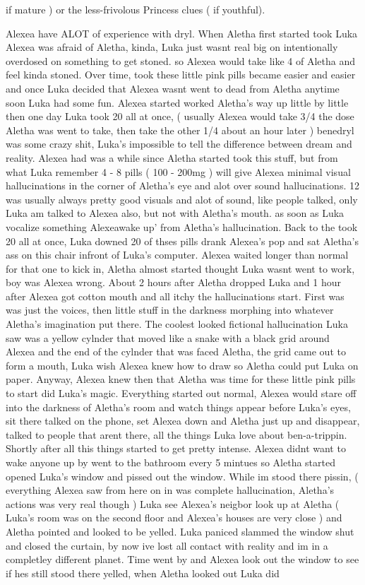 \documentclass[12pt]{book}
\begin{document}
if mature ) or the less-frivolous Princess clues ( if youthful).



Alexea have ALOT of experience with dryl. When Aletha first started took Luka Alexea was afraid of Aletha, kinda, Luka just wasnt real big on intentionally overdosed on something to get stoned. so Alexea would take like 4 of Aletha and feel kinda stoned. Over time, took these little pink pills became easier and easier and once Luka decided that Alexea wasnt went to dead from Aletha anytime soon Luka had some fun. Alexea started worked Aletha's way up little by little then one day Luka took 20 all at once, ( usually Alexea would take 3/4 the dose Aletha was went to take, then take the other 1/4 about an hour later ) benedryl was some crazy shit, Luka's impossible to tell the difference between dream and reality. Alexea had was a while since Aletha started took this stuff, but from what Luka remember 4 - 8 pills ( 100 - 200mg ) will give Alexea minimal visual hallucinations in the corner of Aletha's eye and alot over sound hallucinations. 12 was usually always pretty good visuals and alot of sound, like people talked, only Luka am talked to Alexea also, but not with Aletha's mouth. as soon as Luka vocalize something Alexeawake up' from Aletha's hallucination. Back to the took 20 all at once, Luka downed 20 of thses pills drank Alexea's pop and sat Aletha's ass on this chair infront of Luka's computer. Alexea waited longer than normal for that one to kick in, Aletha almost started thought Luka wasnt went to work, boy was Alexea wrong. About 2 hours after Aletha dropped Luka and 1 hour after Alexea got cotton mouth and all itchy the hallucinations start. First was was just the voices, then little stuff in the darkness morphing into whatever Aletha's imagination put there. The coolest looked fictional hallucination Luka saw was a yellow cylnder that moved like a snake with a black grid around Alexea and the end of the cylnder that was faced Aletha, the grid came out to form a mouth, Luka wish Alexea knew how to draw so Aletha could put Luka on paper. Anyway, Alexea knew then that Aletha was time for these little pink pills to start did Luka's magic. Everything started out normal, Alexea would stare off into the darkness of Aletha's room and watch things appear before Luka's eyes, sit there talked on the phone, set Alexea down and Aletha just up and disappear, talked to people that arent there, all the things Luka love about ben-a-trippin. Shortly after all this things started to get pretty intense. Alexea didnt want to wake anyone up by went to the bathroom every 5 mintues so Aletha started opened Luka's window and pissed out the window. While im stood there pissin, ( everything Alexea saw from here on in was complete hallucination, Aletha's actions was very real though ) Luka see Alexea's neigbor look up at Aletha (  Luka's room was on the second floor and Alexea's houses are very close ) and Aletha pointed and looked to be yelled. Luka paniced slammed the window shut and closed the curtain, by now ive lost all contact with reality and im in a completley different planet. Time went by and Alexea look out the window to see if hes still stood there yelled, when Aletha looked out Luka did 
\end{document}
